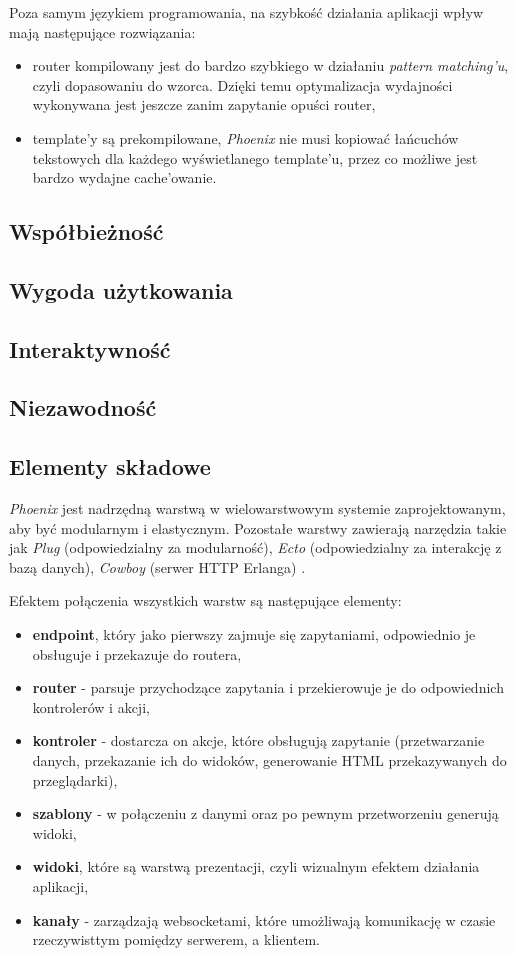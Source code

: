 \documentclass[mgr,oneside]{mgr}
\begin{document}
Poza samym językiem programowania, na szybkość działania aplikacji wpływ mają następujące rozwiązania:
\begin{itemize}
  \item router kompilowany jest do bardzo szybkiego w działaniu \textit{pattern matching'u}, czyli dopasowaniu do wzorca. Dzięki temu optymalizacja wydajności wykonywana jest jeszcze zanim zapytanie opuści router,
  \item template'y są prekompilowane, \textit{Phoenix} nie musi kopiować łańcuchów tekstowych dla każdego wyświetlanego template'u, przez co możliwe jest bardzo wydajne cache'owanie.
\end{itemize}

\subsection{Współbieżność}
\subsection{Wygoda użytkowania}
\subsection{Interaktywność}
\subsection{Niezawodność}


\subsection{Elementy składowe}
\textit{Phoenix} jest nadrzędną warstwą w wielowarstwowym systemie zaprojektowanym, aby być modularnym i elastycznym. Pozostałe warstwy zawierają narzędzia takie jak \textit{Plug} (odpowiedzialny za modularność), \textit{Ecto} (odpowiedzialny za interakcję z bazą danych), \textit{Cowboy} (serwer HTTP Erlanga) \cite{phoenix_docs}.

Efektem połączenia wszystkich warstw są następujące elementy:
\begin{itemize}
  \item \textbf{endpoint}, który jako pierwszy zajmuje się zapytaniami, odpowiednio je obsługuje i przekazuje do routera,
  \item \textbf{router} - parsuje przychodzące zapytania i przekierowuje je do odpowiednich kontrolerów i akcji,
  \item \textbf{kontroler} - dostarcza on akcje, które obsługują zapytanie (przetwarzanie danych, przekazanie ich do widoków, generowanie HTML przekazywanych do przeglądarki),
  \item \textbf{szablony} - w połączeniu z danymi oraz po pewnym przetworzeniu generują widoki,
  \item \textbf{widoki}, które są warstwą prezentacji, czyli wizualnym efektem działania aplikacji,
  \item \textbf{kanały} - zarządzają websocketami, które umożliwają komunikację w czasie rzeczywisttym pomiędzy serwerem, a klientem.
\end{itemize}
\end{document}
